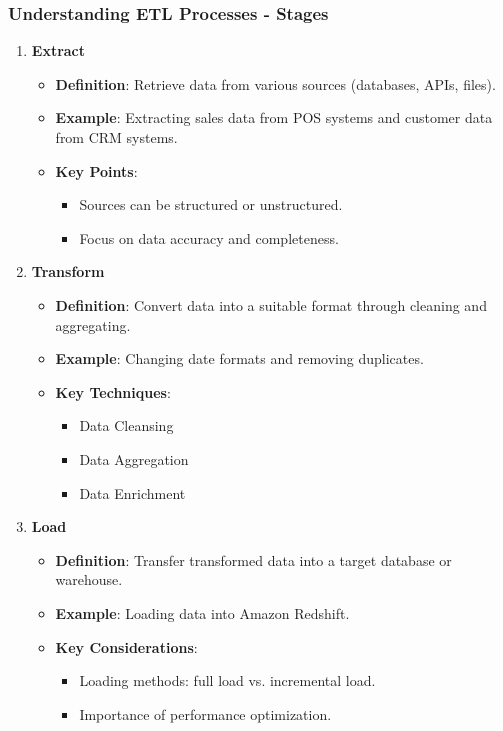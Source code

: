 \documentclass[aspectratio=169]{beamer}
\begin{document}
\begin{frame}[fragile]
    \frametitle{Understanding ETL Processes - Stages}
    \begin{enumerate}
        \item \textbf{Extract}
            \begin{itemize}
                \item \textbf{Definition}: Retrieve data from various sources (databases, APIs, files).
                \item \textbf{Example}: Extracting sales data from POS systems and customer data from CRM systems.
                \item \textbf{Key Points}:
                    \begin{itemize}
                        \item Sources can be structured or unstructured.
                        \item Focus on data accuracy and completeness.
                    \end{itemize}
            \end{itemize}

        \item \textbf{Transform}
            \begin{itemize}
                \item \textbf{Definition}: Convert data into a suitable format through cleaning and aggregating.
                \item \textbf{Example}: Changing date formats and removing duplicates.
                \item \textbf{Key Techniques}:
                    \begin{itemize}
                        \item Data Cleansing
                        \item Data Aggregation
                        \item Data Enrichment
                    \end{itemize}
            \end{itemize}

        \item \textbf{Load}
            \begin{itemize}
                \item \textbf{Definition}: Transfer transformed data into a target database or warehouse.
                \item \textbf{Example}: Loading data into Amazon Redshift.
                \item \textbf{Key Considerations}:
                    \begin{itemize}
                        \item Loading methods: full load vs. incremental load.
                        \item Importance of performance optimization.
                    \end{itemize}
            \end{itemize}
    \end{enumerate}
\end{frame}
\end{document}
